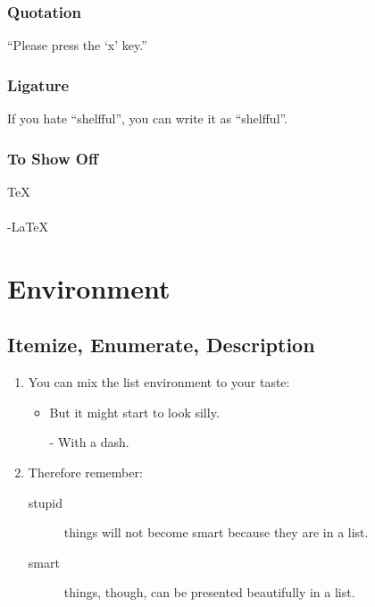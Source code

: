 \documentclass[12pt]{article}
\begin{document}
\subsubsection{Quotation}
``Please press the `x' key.''

\subsubsection{Ligature}
If you hate ``shelfful'', you can write it as ``shelf\mbox{}ful''.

\subsubsection{To Show Off}
\TeX \\
\LaTeXe \\
\AmS-\LaTeX \\

\section{Environment}
\subsection{Itemize, Enumerate, Description}
\begin{enumerate}
	\item You can mix the list environment to your taste:
	      \begin{itemize}
		      \item But it might start to look silly.
		      \item[-] With a dash.
	      \end{itemize}
	\item Therefore remember:
	      \begin{description}
		      \item[stupid] things will not become smart because they are in a list.
		      \item[smart] things, though, can be presented beautifully in a list.
	      \end{description}
\end{enumerate}
\end{document}
